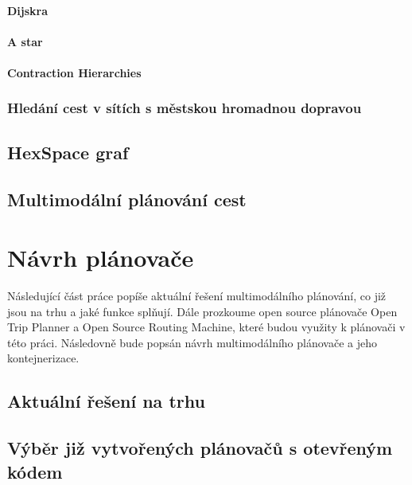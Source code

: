 \documentclass[thesis=M,czech]{FITthesis}[2019/12/23]
\theoremstyle{plain}
\theoremstyle{definition}
\begin{document}
\paragraph{Dijskra}
\paragraph{A star}
\paragraph{Contraction Hierarchies}
\subsubsection{Hledání cest v sítích s městskou hromadnou dopravou}

\subsection{HexSpace graf}


\subsection{Multimodální plánování cest}






\section{Návrh plánovače}

Následující část práce popíše aktuální řešení multimodálního plánování, co již jsou na trhu a jaké funkce splňují. Dále prozkoume open source plánovače Open Trip Planner a Open Source Routing Machine, které budou využity k plánovači v této práci. Následovně bude popsán návrh multimodálního plánovače a jeho kontejnerizace.

\subsection{Aktuální řešení na trhu}











\subsection{Výběr již vytvořených plánovačů s otevřeným kódem}
\end{document}
